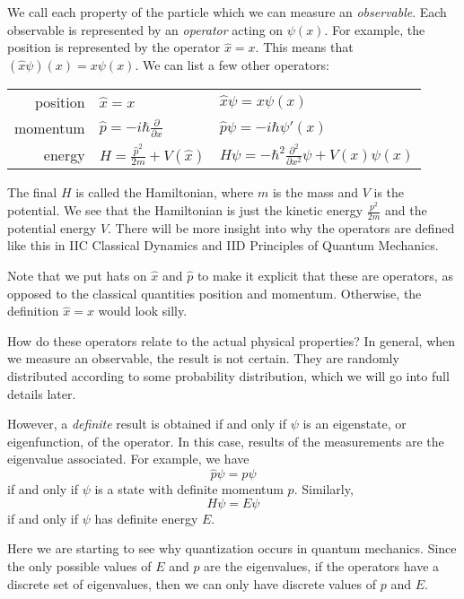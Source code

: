 \documentclass[a4paper]{article}
\begin{document}
We call each property of the particle which we can measure an \emph{observable}. Each observable is represented by an \emph{operator} acting on $\psi(x)$. For example, the position is represented by the operator $\hat{x} = x$. This means that $(\hat{x} \psi)(x) = x\psi(x)$. We can list a few other operators:
\begin{center}
  \begin{tabular}{rll}
    position & $\hat{x} = x$ & $\hat{x} \psi = x\psi(x)$\\
    momentum & $\hat{p} = -i\hbar \frac{\partial}{\partial x}$ & $\hat{p}\psi = -i\hbar \psi'(x)$\\
    energy & $H = \frac{\hat{p}^2}{2m} + V(\hat{x})$ & $H\psi = -\hbar^2 \frac{\partial^2}{\partial x^2}\psi + V(x)\psi(x)$
  \end{tabular}
\end{center}
The final $H$ is called the Hamiltonian, where $m$ is the mass and $V$ is the potential. We see that the Hamiltonian is just the kinetic energy $\frac{p^2}{2m}$ and the potential energy $V$. There will be more insight into why the operators are defined like this in IIC Classical Dynamics and IID Principles of Quantum Mechanics.

Note that we put hats on $\hat{x}$ and $\hat{p}$ to make it explicit that these are operators, as opposed to the classical quantities position and momentum. Otherwise, the definition $\hat{x} = x$ would look silly.

How do these operators relate to the actual physical properties? In general, when we measure an observable, the result is not certain. They are randomly distributed according to some probability distribution, which we will go into full details later.

However, a \emph{definite} result is obtained if and only if $\psi$ is an eigenstate, or eigenfunction, of the operator. In this case, results of the measurements are the eigenvalue associated. For example, we have
\[
  \hat{p} \psi = p\psi
\]
if and only if $\psi$ is a state with definite momentum $p$. Similarly,
\[
  H\psi = E\psi
\]
if and only if $\psi$ has definite energy $E$.

Here we are starting to see why quantization occurs in quantum mechanics. Since the only possible values of $E$ and $p$ are the eigenvalues, if the operators have a discrete set of eigenvalues, then we can only have discrete values of $p$ and $E$.
\end{document}
